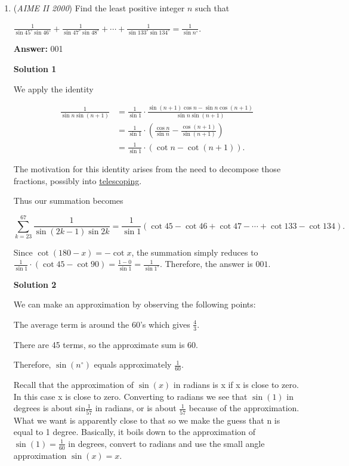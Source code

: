 \begin{enumerate}
 


	\item (\textit{AIME II 2000}) 
Find the least positive integer $n$ such that 

 $\frac 1{\sin 45^\circ\sin 46^\circ}+\frac 1{\sin 47^\circ\sin 48^\circ}+\cdots+\frac 1{\sin 133^\circ\sin 134^\circ}=\frac 1{\sin n^\circ}.$

 \textbf{Answer: }001



\textbf{Solution 1}

We apply the identity 

 
 \begin{align*} \frac{1}{\sin n \sin (n+1)} &= \frac{1}{\sin 1} \cdot \frac{\sin (n+1) \cos n - \sin n \cos (n+1)}{\sin n \sin (n+1)} \\ &= \frac{1}{\sin 1} \cdot \left(\frac{\cos n}{\sin n} - \frac{\cos (n+1)}{\sin (n+1)}\right) \\ &= \frac{1}{\sin 1} \cdot \left(\cot n - \cot (n+1)\right). \end{align*}


 The motivation for this identity arises from the need to decompose those fractions, possibly into \href{https://artofproblemsolving.com/wiki/index.php?title=Telescoping}{telescoping}. 

 Thus our summation becomes 

 
 \[\sum_{k=23}^{67} \frac{1}{\sin (2k-1) \sin 2k} = \frac{1}{\sin 1} \left(\cot 45 - \cot 46 + \cot 47 - \cdots + \cot 133 - \cot 134 \right).\]

 Since $\cot (180 - x) = - \cot x$, the summation simply reduces to $\frac{1}{\sin 1} \cdot \left( \cot 45 - \cot 90 \right) = \frac{1 - 0}{\sin 1} = \frac{1}{\sin 1^{\circ}}$. Therefore, the answer is $\boxed{001}$.

 



\textbf{Solution 2}

We can make an approximation by observing the following points:

 The average term is around the 60's which gives $\frac{4}{3}$.

 There are 45 terms, so the approximate sum is 60.

 Therefore, $\sin(n^\circ)$ equals approximately $\frac{1}{60}$.

 Recall that the approximation of $\sin(x)$ in radians is x if x is close to zero. In this case x is close to zero. Converting to radians we see that $\sin(1)$ in degrees is about sin$\frac{1}{57}$ in radians, or is about $\frac{1}{57}$ because of the approximation. What we want is apparently close to that so we make the guess that n is equal to 1 degree. Basically, it boils down to the approximation of $\sin(1)=\frac{1}{60}$ in degrees, convert to radians and use the small angle approximation $\sin(x)=x$.


\end{enumerate}

